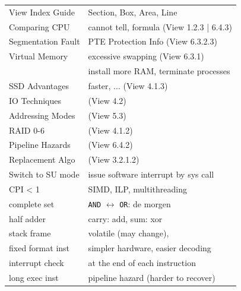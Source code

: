 \documentclass[10pt]{article}
\newcommand{\code}[1]{\texttt{#1}}
\begin{document}
\begin{multicols*}{2}
    \begin{tcolorbox}[title=Past Papers Questions, halign=flush left]
        \begin{tabular}{ll}
            View Index Guide   & Section, Box, Area, Line                          \\
            Comparing CPU      & cannot tell, formula (View 1.2.3 | 6.4.3)         \\
            Segmentation Fault & PTE Protection Info (View 6.3.2.3)                \\
            Virtual Memory     & excessive swapping (View 6.3.1)                   \\
            ~                  & install more RAM, terminate processes             \\
            SSD Advantages     & faster, ... (View 4.1.3)                          \\
            IO Techniques      & (View 4.2)                                        \\
            Addressing Modes   & (View 5.3)                                        \\
            RAID 0-6           & (View 4.1.2)                                      \\
            Pipeline Hazards   & (View 6.4.2)                                      \\
            Replacement Algo   & (View 3.2.1.2)                                    \\
            Switch to SU mode  & issue software interrupt by sys call              \\
            CPI < 1            & SIMD, ILP, multithreading                         \\
            complete set       & \code{AND} $\leftrightarrow$ \code{OR}: de morgen \\
            half adder         & carry: add, sum: xor                              \\
            stack frame        & volatile (may change),                            \\
            fixed format inst  & simpler hardware, easier decoding                 \\
            interrupt check    & at the end of each instruction                    \\
            long exec inst     & pipeline hazard (harder to recover)               \\
        \end{tabular}
    \end{tcolorbox}


\end{multicols*}
\end{document}
